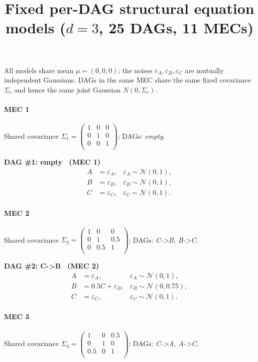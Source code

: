 \documentclass[11pt]{article}
\title{Fixed per-DAG structural equation models ($d=3$, 25 DAGs, 11 MECs)}
\author{}
\date{}
\begin{document}
\maketitle
\noindent All models share mean $\mu=(0,0,0)$; the noises $\varepsilon_A,\varepsilon_B,\varepsilon_C$
are mutually independent Gaussians. DAGs in the same MEC share the same fixed covariance $\Sigma_c$
and hence the same joint Gaussian $N(0,\Sigma_c)$.
\paragraph{MEC 1} Shared covariance \(\Sigma_1=\begin{pmatrix}1 & 0 & 0 \\0 & 1 & 0 \\0 & 0 & 1 \\\end{pmatrix}\); DAGs: \emph{empty}.

\noindent\textbf{DAG \#1: empty \ (MEC 1)}
\begin{align*}
A &= \varepsilon_A, & \varepsilon_A \sim \mathcal{N}(0, 1),\\B &= \varepsilon_B, & \varepsilon_B \sim \mathcal{N}(0, 1),\\C &= \varepsilon_C, & \varepsilon_C \sim \mathcal{N}(0, 1).
\end{align*}

\paragraph{MEC 2} Shared covariance \(\Sigma_2=\begin{pmatrix}1 & 0 & 0 \\0 & 1 & 0.5 \\0 & 0.5 & 1 \\\end{pmatrix}\); DAGs: \emph{C->B, B->C}.

\noindent\textbf{DAG \#2: C->B \ (MEC 2)}
\begin{align*}
A &= \varepsilon_A, & \varepsilon_A \sim \mathcal{N}(0, 1),\\B &= 0.5 C + \varepsilon_B, & \varepsilon_B \sim \mathcal{N}(0, 0.75),\\C &= \varepsilon_C, & \varepsilon_C \sim \mathcal{N}(0, 1).
\end{align*}

\paragraph{MEC 3} Shared covariance \(\Sigma_3=\begin{pmatrix}1 & 0 & 0.5 \\0 & 1 & 0 \\0.5 & 0 & 1 \\\end{pmatrix}\); DAGs: \emph{C->A, A->C}.
\end{document}
